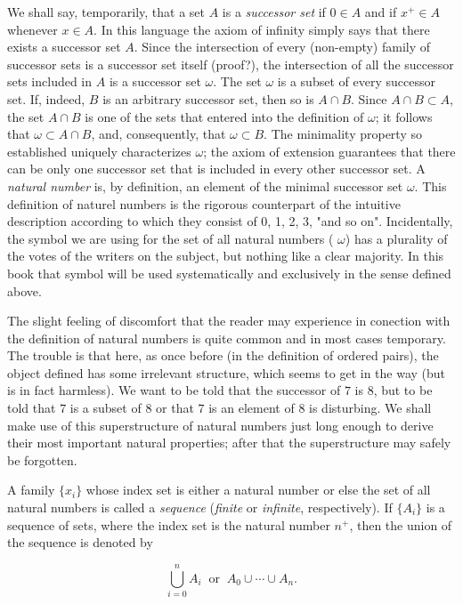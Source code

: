We shall say, temporarily, that a set $A$ is a \textit{successor set} if $0 \in A$ and if $x^{+} \in A$ whenever $x \in A$. In this language the axiom of infinity simply says that there exists a successor set $A$. Since the intersection of every (non-empty) family of successor sets is a successor set itself (proof?), the intersection of all the successor sets included in $A$ is a successor set $ \omega $. The set $ \omega $ is a subset of every successor set. If, indeed, $B$ is an arbitrary successor set, then so is $A \cap B$. Since $ A \cap B \subset A$, the set $A \cap B$ is one of the sets that entered into the definition of $ \omega $; it follows that $ \omega \subset A \cap B$, and, consequently, that $\omega  \subset B$. The minimality property so established uniquely characterizes $ \omega $; the axiom of extension guarantees that there can be only one successor set that is included in every other successor set. A \textit{natural number} is, by definition, an element of the minimal successor set $ \omega$. This definition of naturel numbers is the rigorous counterpart of the intuitive description according to which they consist of 0, 1, 2, 3, "and so on". Incidentally, the symbol we are using for the set of all natural numbers ( $ \omega $) has a plurality of the votes of the writers on the subject, but nothing like a clear majority. In this book that symbol will be used systematically and exclusively in the sense defined above.

The slight feeling of discomfort that the reader may experience in conection with the definition of natural numbers is quite common and in most cases temporary. The trouble is that here, as once before (in the definition of ordered pairs), the object defined has some irrelevant structure, which seems to get in the way (but is in fact harmless). We want to be told that the successor of $7$ is $8$, but to be told that $7$ is a subset of $8$ or that $7$ is an element of $8$ is disturbing. We shall make use of this superstructure of natural numbers just long enough to derive their most important natural properties; after that the superstructure may safely be forgotten.

A family $ \{ x_{i} \} $ whose index set is either a natural number or else the set of all natural numbers is called a \textit{sequence} (\textit{finite} or \textit{infinite}, respectively). If $\{ A_{i} \}$ is a sequence of sets, where the index set is the natural number $n^{+}$, then the union of the sequence is denoted by

\begin{equation*}
\bigcup_{i = 0}^{n} A_{i} \: \text{ or } \: A_{0}\cup \cdots \cup A_{n}.
\end{equation*}

